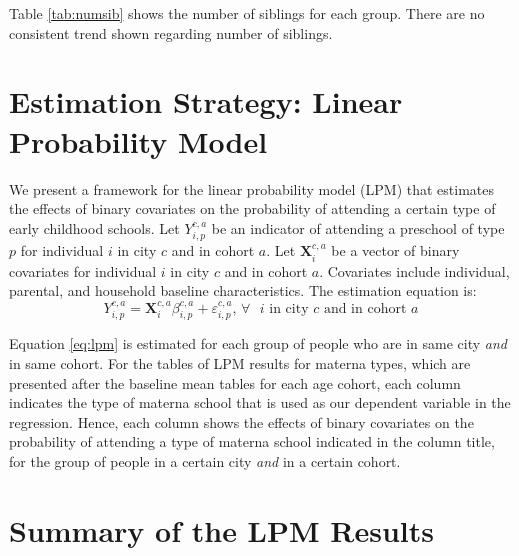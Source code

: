 \documentclass[12pt]{article}
\begin{document}
Table \ref{tab:numsib} shows the number of siblings for each group. There are no consistent trend shown regarding number of siblings. 

\section{Estimation Strategy: Linear Probability Model}
We present a framework for the linear probability model (LPM) that estimates the effects of binary covariates on the probability of attending a certain type of early childhood schools. Let $Y_{i,p}^{c,a}$ be an indicator of attending a preschool of type $p$ for individual $i$ in city $c$ and in cohort $a$. Let $\mathbf{X}_{i}^{c,a}$ be a vector of binary covariates for individual $i$ in city $c$ and in cohort $a$. Covariates include individual, parental, and household baseline characteristics. The estimation equation is:
\begin{equation} \label{eq:lpm}
Y_{i,p}^{c,a} = \mathbf{X}_{i}^{c,a}\beta_{i,p}^{c,a} + \varepsilon_{i,p}^{c,a} \text{, $\forall$ $i$ in city $c$ and in cohort $a$}
\end{equation}

Equation \ref{eq:lpm} is estimated for each group of people who are in same city \textit{and} in same cohort. For the tables of LPM results for materna types, which are presented after the baseline mean tables for each age cohort, each column indicates the type of materna school that is used as our dependent variable in the regression. Hence, each column shows the effects of binary covariates on the probability of attending a type of materna school indicated in the column title, for the group of people in a certain city \textit{and} in a certain cohort. 

\section{Summary of the LPM Results}
\end{document}
